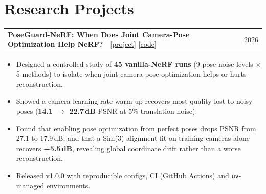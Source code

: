 \documentclass[a4paper,10pt]{article}
\makeatletter
\newcommand{\entry}[4]{%
  \begin{tabularx}{\linewidth}{@{}X r@{}}
    \textbf{#1} & #2 \\
    \textit{\small #3} & \textit{\small\color{subtle} #4} \\
  \end{tabularx}\vspace{-3pt}}
\newcommand{\project}[3]{%
  \begin{tabularx}{\linewidth}{@{}X r@{}}
    \textbf{#1}\ \ {\small #2} & #3 \\
  \end{tabularx}\vspace{-3pt}}
\makeatother
\begin{document}
\section{Research Projects}
\project{PoseGuard-NeRF: When Does Joint Camera-Pose Optimization Help NeRF?}
  {[\href{https://chu-jiaming.github.io/poseguard-nerf/}{project}]
   [\href{https://github.com/chu-jiaming/PoseGuard-NeRF}{code}]}
  {2026}
\begin{itemize}
  \item Designed a controlled study of \textbf{45 vanilla-NeRF runs} (9 pose-noise levels $\times$ 5 methods)
        to isolate when joint camera-pose optimization helps or hurts reconstruction.
  \item Showed a camera learning-rate warm-up recovers most quality lost to noisy poses
        (\textbf{14.1 $\rightarrow$ 22.7\,dB} PSNR at 5\% translation noise).
  \item Found that enabling pose optimization from perfect poses drops PSNR from 27.1 to 17.9\,dB, and that a
        Sim(3) alignment fit on training cameras alone recovers \textbf{+5.5\,dB}, revealing global coordinate
        drift rather than a worse reconstruction.
  \item Released v1.0.0 with reproducible configs, CI (GitHub Actions) and \texttt{uv}-managed environments.
\end{itemize}



\end{document}
